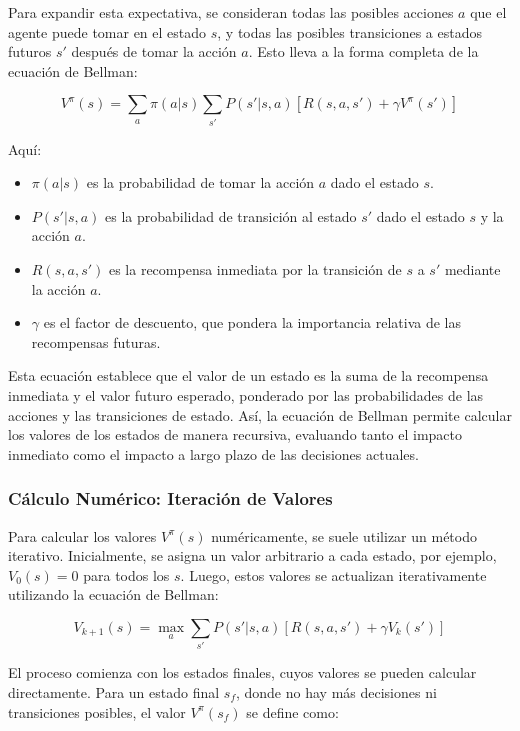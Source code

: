 \documentclass[a4paper,12pt, twoside]{report}
\begin{document}
Para expandir esta expectativa, se consideran todas las posibles acciones \(a\) que el agente 
puede tomar en el estado \(s\), y todas las posibles transiciones a estados futuros \(s'\) 
después de tomar la acción \(a\). Esto lleva a la forma completa de la ecuación de Bellman:

\begin{equation}
V^\pi(s) = \sum_{a} \pi(a|s) \sum_{s'} P(s'|s,a) \left[ R(s,a,s') + \gamma V^\pi(s') \right]
\end{equation}

Aquí:
\begin{itemize}
    \item \(\pi(a|s)\) es la probabilidad de tomar la acción \(a\) dado el estado \(s\).
    \item \(P(s'|s,a)\) es la probabilidad de transición al estado \(s'\) dado el estado \(s\) y la acción \(a\).
    \item \(R(s,a,s')\) es la recompensa inmediata por la transición de \(s\) a \(s'\) mediante la acción \(a\).
    \item \(\gamma\) es el factor de descuento, que pondera la importancia relativa de las recompensas futuras.
\end{itemize}

Esta ecuación establece que el valor de un estado es la suma de la recompensa inmediata 
y el valor futuro esperado, ponderado por las probabilidades de las acciones y las 
transiciones de estado. Así, la ecuación de Bellman permite calcular los valores de 
los estados de manera recursiva, evaluando tanto el impacto inmediato como el impacto a 
largo plazo de las decisiones actuales.

\subsubsection{Cálculo Numérico: Iteración de Valores}

Para calcular los valores \(V^\pi(s)\) numéricamente, se suele utilizar un método iterativo. 
Inicialmente, se asigna un valor arbitrario a cada estado, por ejemplo, \(V_0(s) = 0\) para 
todos los \(s\). Luego, estos valores se actualizan iterativamente utilizando la ecuación de 
Bellman:

\begin{equation}
V_{k+1}(s) = \max_{a} \sum_{s'} P(s'|s,a) \left[ R(s,a,s') + \gamma V_k(s') \right]
\end{equation}

El proceso comienza con los estados finales, cuyos valores se pueden calcular directamente. 
Para un estado final \(s_f\), donde no hay más decisiones ni transiciones posibles, el 
valor \(V^\pi(s_f)\) se define como:
\end{document}
